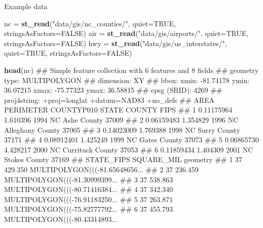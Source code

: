 \documentclass[11pt,ignorenonframetext,]{beamer}
\newenvironment{Shaded}{}{}
\newcommand{\KeywordTok}[1]{\textcolor[rgb]{0.00,0.44,0.13}{\textbf{#1}}}
\newcommand{\DataTypeTok}[1]{\textcolor[rgb]{0.56,0.13,0.00}{#1}}
\newcommand{\StringTok}[1]{\textcolor[rgb]{0.25,0.44,0.63}{#1}}
\newcommand{\OtherTok}[1]{\textcolor[rgb]{0.00,0.44,0.13}{#1}}
\newcommand{\NormalTok}[1]{#1}
\let\oldShaded\Shaded
\let\endoldShaded\endShaded
\renewenvironment{Shaded}{\footnotesize\begin{spacing}{0.9}\oldShaded}{\endoldShaded\end{spacing}}
\let\oldverbatim\verbatim
\let\endoldverbatim\endverbatim
\newcommand{\scriptoutput}{
  \renewenvironment{Shaded}{\scriptsize\begin{spacing}{0.9}\oldShaded}{\endoldShaded\end{spacing}}
  \renewenvironment{verbatim}{\scriptsize\begin{spacing}{0.9}\oldverbatim}{\endoldverbatim\end{spacing}}
}
\begin{document}
\begin{frame}[fragile]{Example data}

\scriptoutput

\begin{Shaded}
\begin{Highlighting}[]
\NormalTok{nc  =}\StringTok{ }\KeywordTok{st_read}\NormalTok{(}\StringTok{"data/gis/nc_counties/"}\NormalTok{, }\DataTypeTok{quiet=}\OtherTok{TRUE}\NormalTok{, }\DataTypeTok{stringsAsFactors=}\OtherTok{FALSE}\NormalTok{)}
\NormalTok{air =}\StringTok{ }\KeywordTok{st_read}\NormalTok{(}\StringTok{"data/gis/airports/"}\NormalTok{, }\DataTypeTok{quiet=}\OtherTok{TRUE}\NormalTok{, }\DataTypeTok{stringsAsFactors=}\OtherTok{FALSE}\NormalTok{)}
\NormalTok{hwy =}\StringTok{ }\KeywordTok{st_read}\NormalTok{(}\StringTok{"data/gis/us_interstates/"}\NormalTok{, }\DataTypeTok{quiet=}\OtherTok{TRUE}\NormalTok{, }\DataTypeTok{stringsAsFactors=}\OtherTok{FALSE}\NormalTok{)}

\KeywordTok{head}\NormalTok{(nc)}
\NormalTok{## Simple feature collection with 6 features and 8 fields}
\NormalTok{## geometry type:  MULTIPOLYGON}
\NormalTok{## dimension:      XY}
\NormalTok{## bbox:           xmin: -81.74178 ymin: 36.07215 xmax: -75.77323 ymax: 36.58815}
\NormalTok{## epsg (SRID):    4269}
\NormalTok{## proj4string:    +proj=longlat +datum=NAD83 +no_defs}
\NormalTok{##         AREA PERIMETER COUNTYP010 STATE           COUNTY  FIPS}
\NormalTok{## 1 0.11175964  1.610396       1994    NC      Ashe County 37009}
\NormalTok{## 2 0.06159483  1.354829       1996    NC Alleghany County 37005}
\NormalTok{## 3 0.14023009  1.769388       1998    NC     Surry County 37171}
\NormalTok{## 4 0.08912401  1.425249       1999    NC     Gates County 37073}
\NormalTok{## 5 0.06865730  4.428217       2000    NC Currituck County 37053}
\NormalTok{## 6 0.11859434  1.404309       2001    NC    Stokes County 37169}
\NormalTok{##   STATE_FIPS SQUARE_MIL                       geometry}
\NormalTok{## 1         37    429.350 MULTIPOLYGON(((-81.65648656...}
\NormalTok{## 2         37    236.459 MULTIPOLYGON(((-81.30999399...}
\NormalTok{## 3         37    538.863 MULTIPOLYGON(((-80.71416384...}
\NormalTok{## 4         37    342.340 MULTIPOLYGON(((-76.91183250...}
\NormalTok{## 5         37    263.871 MULTIPOLYGON(((-75.82777792...}
\NormalTok{## 6         37    455.793 MULTIPOLYGON(((-80.43314893...}
\end{Highlighting}
\end{Shaded}

\end{frame}
\end{document}
